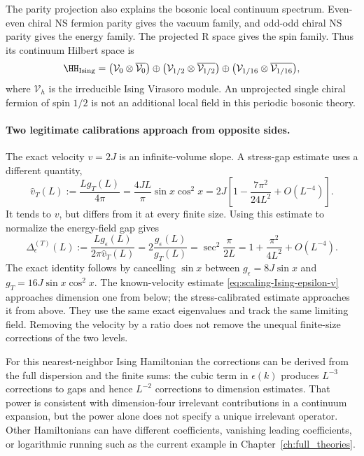 \begin{example}
The parity projection also explains the bosonic local
continuum spectrum. Even-even chiral NS fermion parity gives
the vacuum family, and odd-odd chiral NS parity gives the
energy family. The projected R space gives the spin family.
Thus its continuum Hilbert space is
\[
 \HH_{\rm Ising}
 =\bigl(\mathcal V_0\otimes\overline{\mathcal V_0}\bigr)
  \oplus\bigl(\mathcal V_{1/2}
                   \otimes\overline{\mathcal V_{1/2}}\bigr)
  \oplus\bigl(\mathcal V_{1/16}
                   \otimes\overline{\mathcal V_{1/16}}\bigr),
\]
where $\mathcal V_h$ is the irreducible Ising Virasoro module.
An unprojected single chiral fermion of spin $1/2$ is not an
additional local field in this periodic bosonic theory.

\paragraph{Two legitimate calibrations approach from opposite sides.}

The exact velocity $v=2J$ is an infinite-volume slope. A
stress-gap estimate uses a different quantity,
\[
 \widehat v_T(L):=\frac{Lg_T(L)}{4\pi}
 =\frac{4JL}{\pi}\sin x\cos^2x
 =2J\left[1-\frac{7\pi^2}{24L^2}+O(L^{-4})\right].
\]
It tends to $v$, but differs from it at every finite size.
Using this estimate to normalize the energy-field gap gives
\begin{equation}
 \Delta_\epsilon^{(T)}(L)
 :=\frac{L g_\epsilon(L)}{2\pi\widehat v_T(L)}
 =2\frac{g_\epsilon(L)}{g_T(L)}
 =\sec^2\frac{\pi}{2L}
 =1+\frac{\pi^2}{4L^2}+O(L^{-4}).
 \label{eq:scaling-Ising-epsilon-stress}
\end{equation}
The exact identity follows by cancelling $\sin x$ between
$g_\epsilon=8J\sin x$ and $g_T=16J\sin x\cos^2x$.
The known-velocity estimate
\eqref{eq:scaling-Ising-epsilon-v} approaches dimension one
from below; the stress-calibrated estimate approaches it from
above. They use the same exact eigenvalues and track the same
limiting field. Removing the velocity by a ratio does not
remove the unequal finite-size corrections of the two levels.

For this nearest-neighbor Ising Hamiltonian the corrections can
be derived from the full dispersion and the finite sums:
the cubic term in $\epsilon(k)$ produces $L^{-3}$ corrections
to gaps and hence $L^{-2}$ corrections to dimension estimates.
That power is consistent with dimension-four irrelevant
contributions in a continuum expansion, but the power alone
does not specify a unique irrelevant operator.
Other Hamiltonians can have different coefficients, vanishing
leading coefficients, or logarithmic running such as the
current example in Chapter~\ref{ch:full_theories}.


\end{example}
